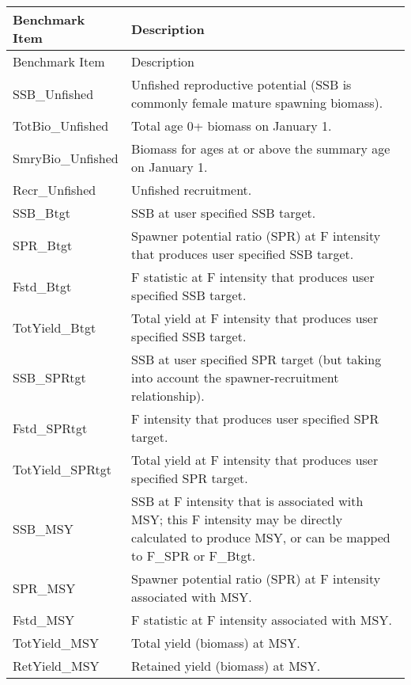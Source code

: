 \begin{center}
	\begin{longtable}{p{4cm} p{11cm}}
		\hline
		Benchmark Item &  Description\Tstrut\Bstrut\\
		\hline
		\endfirsthead

		\hline
		Benchmark Item &  Description\Tstrut\Bstrut\\
		\hline
		\endhead
		
		\endfoot
		\hline		
		\endlastfoot
		
		SSB\_Unfished \Tstrut& Unfished reproductive potential (SSB is commonly female mature spawning biomass).\\
		TotBio\_Unfished \Tstrut& Total age 0+ biomass on January 1.\\
		SmryBio\_Unfished \Tstrut& Biomass for ages at or above the summary age on January 1.\\
		Recr\_Unfished \Tstrut& Unfished recruitment.\\
		SSB\_Btgt \Tstrut& SSB at user specified SSB target.\\
		SPR\_Btgt \Tstrut& Spawner potential ratio (SPR) at F intensity that produces user specified SSB target.\\
		Fstd\_Btgt \Tstrut& F statistic at F intensity that produces user specified SSB target.\\
		TotYield\_Btgt \Tstrut& Total yield at F intensity that produces user specified SSB target.\\
		SSB\_SPRtgt \Tstrut& SSB at user specified SPR target (but taking into account the spawner-recruitment relationship).\\
		Fstd\_SPRtgt \Tstrut& F intensity that produces user specified SPR target.\\
		TotYield\_SPRtgt \Tstrut& Total yield at F intensity that produces user specified SPR target.\\
		SSB\_MSY \Tstrut& SSB at F intensity that is associated with MSY; this F intensity may be directly calculated to produce MSY, or can be mapped to F\_SPR or F\_Btgt.\\
		SPR\_MSY \Tstrut& Spawner potential ratio (SPR) at F intensity associated with MSY.\\
		Fstd\_MSY \Tstrut& F statistic at F intensity associated with MSY.\\
		TotYield\_MSY \Tstrut& Total yield (biomass) at MSY.\\
		RetYield\_MSY \Tstrut& Retained yield (biomass) at MSY.\Bstrut\\ 
	\end{longtable}
\end{center}

